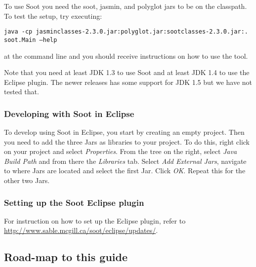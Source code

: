 \documentclass{article}
\newcommand{\code}[1]{\texttt{\small #1}}
\begin{document}
To use Soot you need the soot, jasmin, and polyglot jars to be on the
classpath. To test the setup, try executing:
\begin{center}
  \code{java -cp jasminclasses-2.3.0.jar:polyglot.jar:sootclasses-2.3.0.jar:. soot.Main --help}
\end{center}
at the command line and you should receive instructions on how to use
the tool.

Note that you need at least JDK 1.3 to use Soot and at least JDK 1.4
to use the Eclipse plugin. The newer releases has some support for JDK
1.5 but we have not tested that.

\subsubsection*{Developing with Soot in Eclipse}

To develop using Soot in Eclipse, you start by creating an empty
project. Then you need to add the three Jars as libraries to your
project. To do this, right click on your project and select
\emph{Properties}. From the tree on the right, select \emph{Java Build
  Path} and from there the \emph{Libraries} tab. Select \emph{Add
  External Jars}, navigate to where Jars are located and select
the first Jar. Click \emph{OK}. Repeat this for the other two Jars.

\subsubsection*{Setting up the Soot Eclipse plugin}

For instruction on how to set up the Eclipse plugin, refer to
\url{http://www.sable.mcgill.ca/soot/eclipse/updates/}.

\subsection{Road-map to this guide}
\end{document}
